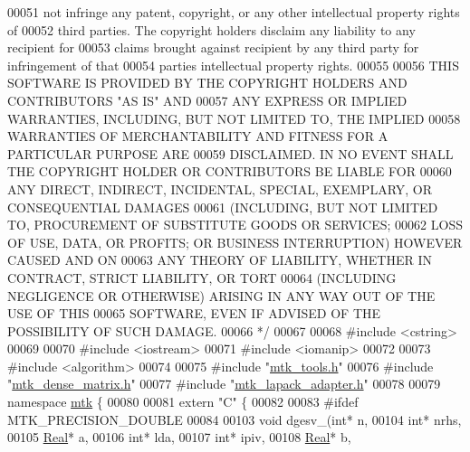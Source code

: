\begin{DoxyCode}
00051 \textcolor{comment}{not infringe any patent, copyright, or any other intellectual property rights of}
00052 \textcolor{comment}{third parties. The copyright holders disclaim any liability to any recipient for}
00053 \textcolor{comment}{claims brought against recipient by any third party for infringement of that}
00054 \textcolor{comment}{parties intellectual property rights.}
00055 \textcolor{comment}{}
00056 \textcolor{comment}{THIS SOFTWARE IS PROVIDED BY THE COPYRIGHT HOLDERS AND CONTRIBUTORS "AS IS" AND}
00057 \textcolor{comment}{ANY EXPRESS OR IMPLIED WARRANTIES, INCLUDING, BUT NOT LIMITED TO, THE IMPLIED}
00058 \textcolor{comment}{WARRANTIES OF MERCHANTABILITY AND FITNESS FOR A PARTICULAR PURPOSE ARE}
00059 \textcolor{comment}{DISCLAIMED. IN NO EVENT SHALL THE COPYRIGHT HOLDER OR CONTRIBUTORS BE LIABLE FOR}
00060 \textcolor{comment}{ANY DIRECT, INDIRECT, INCIDENTAL, SPECIAL, EXEMPLARY, OR CONSEQUENTIAL DAMAGES}
00061 \textcolor{comment}{(INCLUDING, BUT NOT LIMITED TO, PROCUREMENT OF SUBSTITUTE GOODS OR SERVICES;}
00062 \textcolor{comment}{LOSS OF USE, DATA, OR PROFITS; OR BUSINESS INTERRUPTION) HOWEVER CAUSED AND ON}
00063 \textcolor{comment}{ANY THEORY OF LIABILITY, WHETHER IN CONTRACT, STRICT LIABILITY, OR TORT}
00064 \textcolor{comment}{(INCLUDING NEGLIGENCE OR OTHERWISE) ARISING IN ANY WAY OUT OF THE USE OF THIS}
00065 \textcolor{comment}{SOFTWARE, EVEN IF ADVISED OF THE POSSIBILITY OF SUCH DAMAGE.}
00066 \textcolor{comment}{*/}
00067 
00068 \textcolor{preprocessor}{#include <cstring>}
00069 
00070 \textcolor{preprocessor}{#include <iostream>}
00071 \textcolor{preprocessor}{#include <iomanip>}
00072 
00073 \textcolor{preprocessor}{#include <algorithm>}
00074 
00075 \textcolor{preprocessor}{#include "\hyperlink{mtk__tools_8h}{mtk\_tools.h}"}
00076 \textcolor{preprocessor}{#include "\hyperlink{mtk__dense__matrix_8h}{mtk\_dense\_matrix.h}"}
00077 \textcolor{preprocessor}{#include "\hyperlink{mtk__lapack__adapter_8h}{mtk\_lapack\_adapter.h}"}
00078 
00079 \textcolor{keyword}{namespace }\hyperlink{namespacemtk}{mtk} \{
00080 
00081 \textcolor{keyword}{extern} \textcolor{stringliteral}{"C"} \{
00082 
00083 \textcolor{preprocessor}{#ifdef MTK\_PRECISION\_DOUBLE}
00084 
00103 \textcolor{keywordtype}{void} dgesv\_(\textcolor{keywordtype}{int}* n,
00104             \textcolor{keywordtype}{int}* nrhs,
00105             \hyperlink{group__c01-roots_gac080bbbf5cbb5502c9f00405f894857d}{Real}* a,
00106             \textcolor{keywordtype}{int}* lda,
00107             \textcolor{keywordtype}{int}* ipiv,
00108             \hyperlink{group__c01-roots_gac080bbbf5cbb5502c9f00405f894857d}{Real}* b,

\end{DoxyCode}
